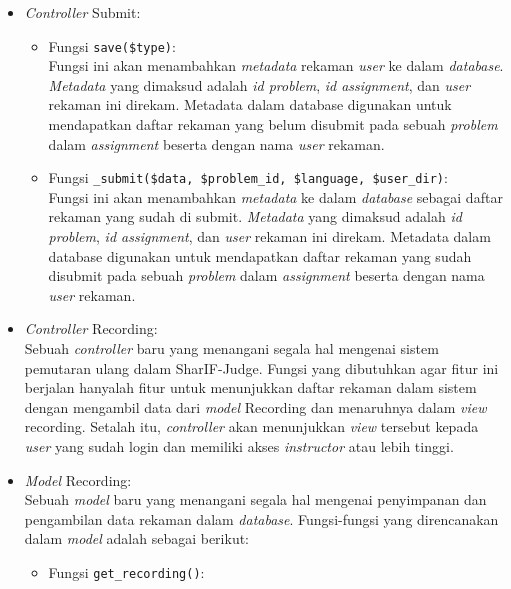 \begin{itemize}
    \item \textit{Controller} Submit:
    \begin{itemize}
        \item Fungsi \verb|save($type)|: \\
        Fungsi ini akan menambahkan \textit{metadata} rekaman \textit{user} ke dalam \textit{database}. \textit{Metadata} yang dimaksud adalah \textit{id problem}, \textit{id assignment}, dan \textit{user} rekaman ini direkam. Metadata dalam database digunakan untuk mendapatkan daftar rekaman yang belum disubmit pada sebuah \textit{problem} dalam \textit{assignment} beserta dengan nama \textit{user} rekaman.
        \item Fungsi \verb|_submit($data, $problem_id, $language, $user_dir)|: \\
        Fungsi ini akan menambahkan \textit{metadata} ke dalam \textit{database} sebagai daftar rekaman yang sudah di submit. \textit{Metadata} yang dimaksud adalah \textit{id problem}, \textit{id assignment}, dan \textit{user} rekaman ini direkam. Metadata dalam database digunakan untuk mendapatkan daftar rekaman yang sudah disubmit pada sebuah \textit{problem} dalam \textit{assignment} beserta dengan nama \textit{user} rekaman.
    \end{itemize}
    \item \textit{Controller} Recording: \\
    Sebuah \textit{controller} baru yang menangani segala hal mengenai sistem pemutaran ulang dalam SharIF-Judge. Fungsi yang dibutuhkan agar fitur ini berjalan hanyalah fitur untuk menunjukkan daftar rekaman dalam sistem dengan mengambil data dari \textit{model} Recording dan menaruhnya dalam \textit{view} recording. Setalah itu, \textit{controller} akan menunjukkan \textit{view} tersebut kepada \textit{user} yang sudah login dan memiliki akses \textit{instructor} atau lebih tinggi.
    \item \textit{Model} Recording: \\
    Sebuah \textit{model} baru yang menangani segala hal mengenai penyimpanan dan pengambilan data rekaman dalam \textit{database}. Fungsi-fungsi yang direncanakan dalam \textit{model} adalah sebagai berikut:
    \begin{itemize}
        \item Fungsi \verb|get_recording()|: \\

\end{itemize}
\end{itemize}
